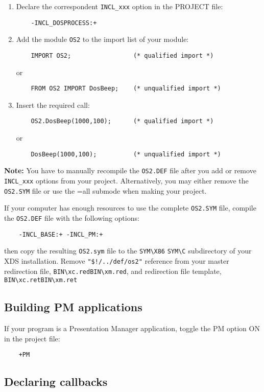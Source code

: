 \begin{enumerate}

\item Declare the correspondent \verb'INCL_xxx' option in the PROJECT file:

\verb'    -INCL_DOSPROCESS:+'

\item Add the module \verb'OS2' to the import list of your module:

\verb'    IMPORT OS2;                 (* qualified import *)'

or

\verb'    FROM OS2 IMPORT DosBeep;    (* unqualified import *)'

\item Insert the required call:

\verb'    OS2.DosBeep(1000,100);      (* qualified import *)'

or

\verb'    DosBeep(1000,100);          (* unqualified import *)'

\end{enumerate}

{\bf Note:} You have to manually recompile the \verb'OS2.DEF' file after you
add or remove \verb'INCL_xxx' options from your project. Alternatively,
you may either remove the \verb'OS2.SYM' file or use the =all submode
when making your project.

If your computer has enough resources to use the complete \verb'OS2.SYM'
file, compile the \verb'OS2.DEF' file with the following options:

\verb'    -INCL_BASE:+ -INCL_PM:+'

then copy the resulting \verb'OS2.sym' file to the
\ifgencode \verb'SYM\X86' \else \verb'SYM\C' \fi
subdirectory of your XDS installation.
Remove \verb'"$!/../def/os2"' reference from your master redirection file, %
\ifgencode \verb'BIN\xc.red'\else\verb'BIN\xm.red'\fi,
and redirection file template,
\ifgencode \verb'BIN\xc.ret'\else\verb'BIN\xm.ret'\fi

\subsection{Building PM applications}

If your program is a Presentation Manager application, toggle
the PM option ON in the project file:

\verb'    +PM'

\subsection{Declaring callbacks}

